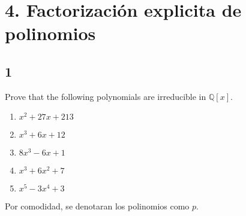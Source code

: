 \documentclass[11pt]{article}
\newcommand{\set}[1]{\mathbb{#1}}
\theoremstyle{definition}
\begin{document}
    \section{4. Factorización explicita de polinomios}
    \subsection{1}
    Prove that the following polynomials are irreducible in $\set{Q}[x]$.
    \begin{enumerate}[label=\textbf{(\alph*)}]
        \item $x^2+27x+213$

        \item $x^3+6x+12$

        \item $8x^3-6x+1$

        \item $x^3+6x^2+7$

        \item $x^5-3x^4+3$
    \end{enumerate}
    Por comodidad, se denotaran los polinomios como $p$.
\end{document}
